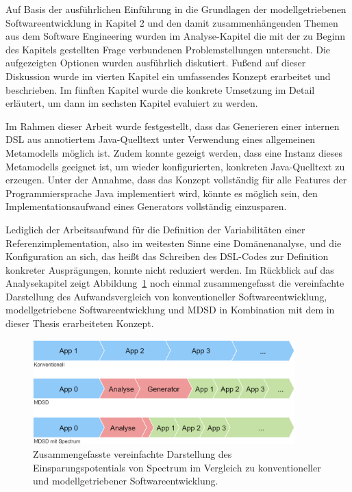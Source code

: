 \documentclass[12pt,oneside,a4paper,parskip]{scrbook}
\begin{document}
Auf Basis der ausführlichen Einführung in die Grundlagen der modellgetriebenen Softwareentwicklung in Kapitel 2 und den damit zusammenhängenden Themen aus dem Software Engineering wurden im Analyse-Kapitel die mit der zu Beginn des Kapitels gestellten Frage verbundenen Problemstellungen untersucht. Die aufgezeigten Optionen wurden ausführlich diskutiert. Fußend auf dieser Diskussion wurde im vierten Kapitel ein umfassendes Konzept erarbeitet und beschrieben. Im fünften Kapitel wurde die konkrete Umsetzung im Detail erläutert, um dann im sechsten Kapitel evaluiert zu werden.

Im Rahmen dieser Arbeit wurde festgestellt, dass das Generieren einer internen DSL aus annotiertem Java-Quelltext unter Verwendung eines allgemeinen Metamodells möglich ist. Zudem konnte gezeigt werden, dass eine Instanz dieses Metamodells geeignet ist, um wieder konfigurierten, konkreten Java-Quelltext zu erzeugen. Unter der Annahme, dass das Konzept vollständig für alle Features der Programmiersprache Java implementiert wird, könnte es möglich sein, den Implementationsaufwand eines Generators vollständig einzusparen.

Lediglich der Arbeitsaufwand für die Definition der Variabilitäten einer Referenzimplementation, also im weitesten Sinne eine Domänenanalyse, und die Konfiguration an sich, das heißt das Schreiben des DSL-Codes zur Definition konkreter Ausprägungen, konnte nicht reduziert werden. Im Rückblick auf das Analysekapitel zeigt Abbildung~\ref{fig:vgl3} noch einmal zusammengefasst die vereinfachte Darstellung des Aufwandsvergleich von konventioneller Softwareentwicklung, modellgetriebene Softwareentwicklung und MDSD in Kombination mit dem in dieser Thesis erarbeiteten Konzept.

\begin{figure}[htbp]
\centering
\includegraphics[width=0.9\textwidth]{bilder/vergleich_3}
\caption{Zusammengefasste vereinfachte Darstellung des Einsparungspotentials von Spectrum im Vergleich zu konventioneller und modellgetriebener Softwareentwicklung.}
\label{fig:vgl3}
\end{figure}
\end{document}
